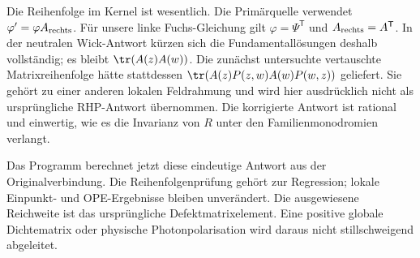Die Reihenfolge im Kernel ist wesentlich. Die Primärquelle verwendet
$\varphi'=\varphi A_{\rm rechts}$. Für unsere linke Fuchs-Gleichung gilt
$\varphi=\Psi^{\mathsf T}$ und $A_{\rm rechts}=A^{\mathsf T}$.
In der neutralen Wick-Antwort kürzen sich die Fundamentallösungen deshalb
vollständig; es bleibt $\tr(A(z)A(w))$.
Die zunächst untersuchte vertauschte Matrixreihenfolge hätte stattdessen
$\tr(A(z)P(z,w)A(w)P(w,z))$ geliefert. Sie gehört zu einer anderen lokalen
Feldrahmung und wird hier ausdrücklich nicht als ursprüngliche RHP-Antwort
übernommen. Die korrigierte Antwort ist rational und einwertig, wie es die
Invarianz von $R$ unter den Familienmonodromien verlangt.

Das Programm  berechnet
jetzt diese eindeutige Antwort aus der Originalverbindung. Die
Reihenfolgenprüfung gehört zur Regression; lokale Einpunkt- und
OPE-Ergebnisse bleiben unverändert. Die ausgewiesene Reichweite ist das
ursprüngliche Defektmatrixelement. Eine positive globale Dichtematrix oder
physische Photonpolarisation wird daraus nicht stillschweigend abgeleitet.



